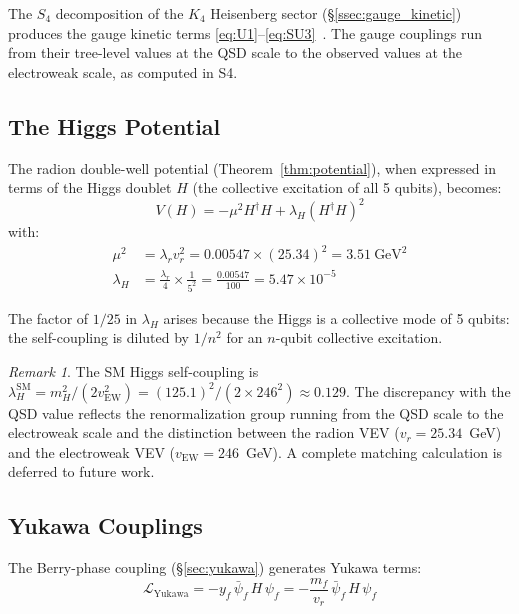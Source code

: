 \documentclass[11pt,a4paper]{article}
\theoremstyle{definition}
\theoremstyle{remark}
\newtheorem{remark}[theorem]{Remark}
\newcommand{\LL}{\mathcal{L}}
\begin{document}
The $S_4$ decomposition of the $K_4$ Heisenberg sector (\S\ref{ssec:gauge_kinetic}) produces the gauge kinetic terms \eqref{eq:U1}--\eqref{eq:SU3}~\cite{Glashow1961,Weinberg1967,Salam1968}. The gauge couplings run from their tree-level values at the QSD scale to the observed values at the electroweak scale, as computed in S4.

\subsection{The Higgs Potential}

The radion double-well potential (Theorem~\ref{thm:potential}), when expressed in terms of the Higgs doublet $H$ (the collective excitation of all 5 qubits), becomes:
\begin{equation}
V(H) = -\mu^2 H^\dagger H + \lambda_H (H^\dagger H)^2
\end{equation}
with:
\begin{align}
\mu^2 &= \lambda_r v_r^2 = 0.00547 \times (25.34)^2 = 3.51~\text{GeV}^2 \\
\lambda_H &= \frac{\lambda_r}{4} \times \frac{1}{5^2} = \frac{0.00547}{100} = 5.47 \times 10^{-5}
\end{align}

The factor of $1/25$ in $\lambda_H$ arises because the Higgs is a collective mode of 5 qubits: the self-coupling is diluted by $1/n^2$ for an $n$-qubit collective excitation.

\begin{remark}
The SM Higgs self-coupling is $\lambda_H^{\mathrm{SM}} = m_H^2/(2v_{\mathrm{EW}}^2) = (125.1)^2/(2 \times 246^2) \approx 0.129$. The discrepancy with the QSD value reflects the renormalization group running from the QSD scale to the electroweak scale and the distinction between the radion VEV ($v_r = 25.34$~GeV) and the electroweak VEV ($v_{\mathrm{EW}} = 246$~GeV). A complete matching calculation is deferred to future work.
\end{remark}

\subsection{Yukawa Couplings}

The Berry-phase coupling (\S\ref{sec:yukawa}) generates Yukawa terms:
\begin{equation}
\LL_{\mathrm{Yukawa}} = -y_f\,\bar{\psi}_f\,H\,\psi_f = -\frac{m_f}{v_r}\,\bar{\psi}_f\,H\,\psi_f
\end{equation}
\end{document}

